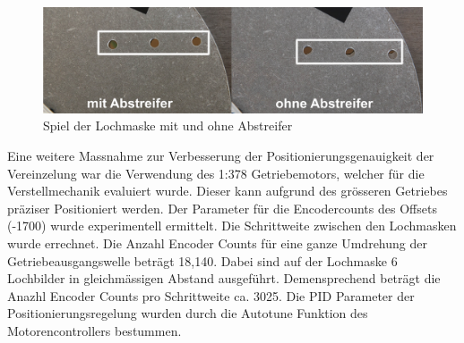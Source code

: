 \begin{figure}[H]
	\includegraphics[width=1\textwidth]{Illustrationen/7-Inbetriebnahme_und_Kalibration/spiel_lochmaske_1.jpg}
	\caption{Spiel der Lochmaske mit und ohne Abstreifer}
	\label{fig:spiel_lochmaske}
\end{figure}

Eine weitere Massnahme zur Verbesserung der Positionierungsgenauigkeit der Vereinzelung war die Verwendung des 1:378 Getriebemotors, welcher für die Verstellmechanik evaluiert wurde. Dieser kann aufgrund des grösseren Getriebes präziser Positioniert werden. Der Parameter für die Encodercounts des Offsets (-1700) wurde experimentell ermittelt. Die Schrittweite zwischen den Lochmasken wurde errechnet. Die Anzahl Encoder Counts für eine ganze Umdrehung der Getriebeausgangswelle beträgt 18,140. Dabei sind auf der Lochmaske 6 Lochbilder in gleichmässigen Abstand ausgeführt. Demensprechend beträgt die Anazhl Encoder Counts pro Schrittweite ca. 3025. Die PID Parameter der Positionierungsregelung wurden durch die Autotune Funktion des Motorencontrollers bestummen.